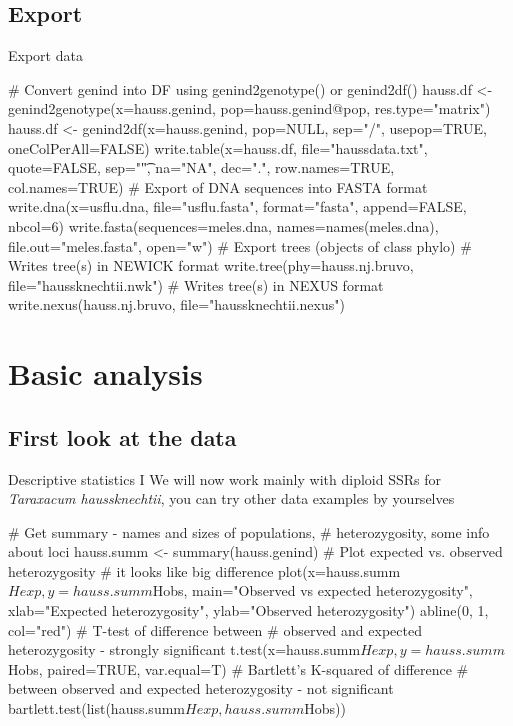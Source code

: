 \documentclass[compress, ucs, xelatex, 11pt, xcolor=svgnames,
  hyperref={
    bookmarks=true,
    unicode=true,
    colorlinks=true,
    pdftitle={Molecular data in R},
    plainpages=false,
    pdfauthor={Vojtech Zeisek},
    pdfsubject={Course about phylogeny and evolution in R},
    pdfcreator={XeLaTeX},
    pdfkeywords={R, evolution, phylogeny, molecular data},
    linkcolor=Tomato,
    anchorcolor=SaddleBrown,
    citecolor=Goldenrod,
    filecolor=DarkMagenta,
    menucolor=Sienna,
    urlcolor=DarkTurquoise,
    pdftex},
  url={hyphens, lowtilde} %
  ]{beamer}
\begin{document}
\subsection{Export}

\begin{frame}[fragile]{Export data}
  \begin{spluscode}
    # Convert genind into DF using genind2genotype() or genind2df()
    hauss.df <- genind2genotype(x=hauss.genind, pop=hauss.genind@pop,
      res.type="matrix")
    hauss.df <- genind2df(x=hauss.genind, pop=NULL, sep="/",
      usepop=TRUE, oneColPerAll=FALSE)
    write.table(x=hauss.df, file="haussdata.txt", quote=FALSE,
      sep="\t", na="NA", dec=".", row.names=TRUE, col.names=TRUE)
    # Export of DNA sequences into FASTA format
    write.dna(x=usflu.dna, file="usflu.fasta", format="fasta",
      append=FALSE, nbcol=6)
    write.fasta(sequences=meles.dna, names=names(meles.dna),
      file.out="meles.fasta", open="w")
    # Export trees (objects of class phylo)
    # Writes tree(s) in NEWICK format
    write.tree(phy=hauss.nj.bruvo, file="haussknechtii.nwk")
    # Writes tree(s) in NEXUS format
    write.nexus(hauss.nj.bruvo, file="haussknechtii.nexus")
  \end{spluscode}
\end{frame}

\section{Basic analysis}

\subsection{First look at the data}

\begin{frame}[fragile]{Descriptive statistics I}
We will now work mainly with diploid SSRs for \textit{Taraxacum haussknechtii}, you can try other data examples by yourselves
  \begin{spluscode}
    # Get summary - names and sizes of populations,
    # heterozygosity, some info about loci
    hauss.summ <- summary(hauss.genind)
    # Plot expected vs. observed heterozygosity
    # it looks like big difference
    plot(x=hauss.summ$Hexp, y=hauss.summ$Hobs,
      main="Observed vs expected heterozygosity",
      xlab="Expected heterozygosity", ylab="Observed heterozygosity")
    abline(0, 1, col="red")
    # T-test of difference between
    # observed and expected heterozygosity - strongly significant
    t.test(x=hauss.summ$Hexp, y=hauss.summ$Hobs, paired=TRUE, var.equal=T)
    # Bartlett's K-squared of difference
    # between observed and expected heterozygosity - not significant
    bartlett.test(list(hauss.summ$Hexp,hauss.summ$Hobs))
  \end{spluscode}
\end{frame}
\end{document}
